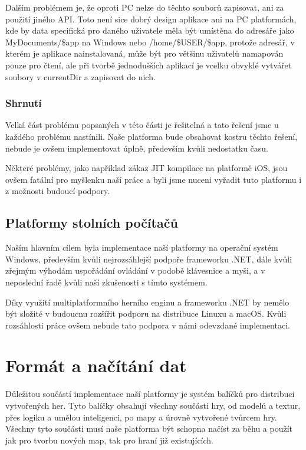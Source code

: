 Dalším problémem je, že oproti PC nelze do těchto souborů zapisovat, ani za použití jiného API. Toto není sice dobrý design aplikace ani na PC platformách, kde by data specifická pro daného uživatele měla být umístěna do adresáře jako MyDocuments/\$app na Windows nebo /home/\$USER/\$app, protože adresář, v kterém je aplikace nainstalovaná, může být pro většinu uživatelů namapován pouze pro čtení, ale při tvorbě jednodušších aplikací je vcelku obvyklé vytvářet soubory v currentDir a zapisovat do nich.


\subsubsection{Shrnutí}
Velká část problému popsaných v této části je řešitelná a tato řešení jsme u každého problému nastínili. Naše platforma bude obsahovat kostru těchto řešení, nebude je ovšem implementovat úplně, především kvůli nedostatku času. 

Některé problémy, jako například zákaz JIT kompilace na platformě iOS, jsou ovšem fatální pro myšlenku naší práce a byli jsme nuceni vyřadit tuto platformu i z možnosti budoucí podpory.


\subsection{Platformy stolních počítačů}
Naším hlavním cílem byla implementace naší platformy na operační systém Windows, především kvůli nejrozsáhlejší podpoře frameworku .NET, dále kvůli zřejmým výhodám uspořádání ovládání v podobě klávesnice a myši, a v neposlední řadě kvůli naší zkušenosti s tímto systémem.

Díky využití multiplatformního herního enginu a frameworku .NET by nemělo být složité v budoucnu rozšířit podporu na distribuce Linuxu a macOS. Kvůli rozsáhlosti práce ovšem nebude tato podpora v námi odevzdané implementaci.

\section{Formát a načítání dat}
Důležitou součástí implementace naší platformy je systém balíčků pro distribuci vytvořených her. Tyto balíčky obsahují všechny součásti hry, od modelů a textur, přes logiku a umělou inteligenci, po mapy a úrovně vytvořené tvůrcem hry. Všechny tyto součásti musí naše platforma být schopna načíst za běhu a použít jak pro tvorbu nových map, tak pro hraní již existujících.

